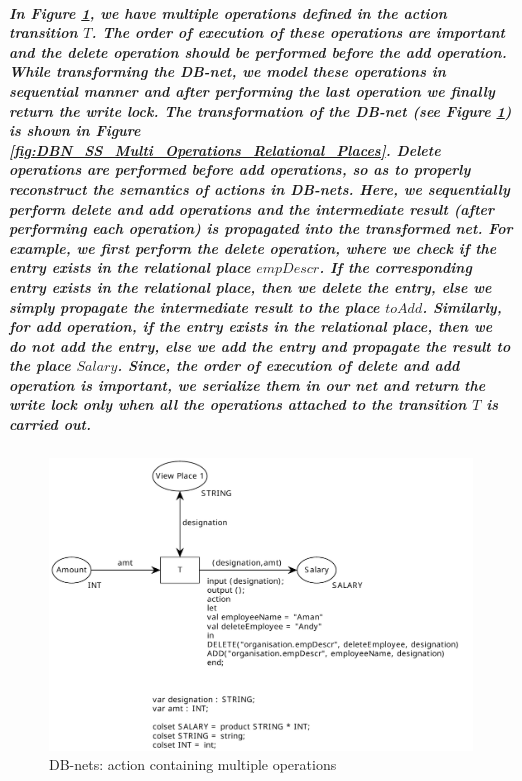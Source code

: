 \subparagraph*{\textnormal{In Figure \ref{fig:DBN_SS_Multi_Operations}, we have multiple operations defined in the action transition $\mathit{T}$. The order of execution of these operations are important and the \textit{delete} operation should be performed before the \textit{add} operation. While transforming the DB-net, we model these operations in sequential manner and after performing the last operation we finally return the write lock. The transformation of the DB-net (see Figure \ref{fig:DBN_SS_Multi_Operations}) is shown in Figure \ref{fig:DBN_SS_Multi_Operations_Relational_Places}. Delete operations are performed before add operations, so as to properly reconstruct the semantics of actions in DB-nets. Here, we sequentially perform delete and add operations and the intermediate result (after performing each operation) is propagated into the transformed net. For example, we first perform the delete operation, where we check if the entry exists in the relational place $\mathit{empDescr}$. If the corresponding entry exists in the relational place, then we delete the entry, else we simply propagate the intermediate result to the place $\mathit{toAdd}$. Similarly, for add operation, if the entry exists in the relational place, then we do not add the entry, else we add the entry and propagate the result to the place $\mathit{Salary}$. Since, the order of execution of \textit{delete} and \textit{add} operation is important, we serialize them in our net and return the write lock only when all the operations attached to the transition $\mathit{T}$ is carried out.}}

\begin{figure}[!htbp]
	\centering
	\includegraphics[scale = 0.40]{DBN_SS_Multi_Operations.pdf}
	\caption{DB-nets: action containing multiple operations}
	\label{fig:DBN_SS_Multi_Operations}
\end{figure}

